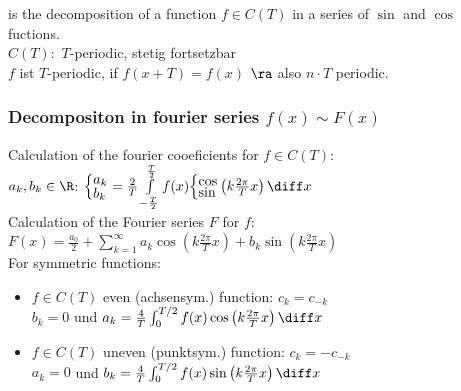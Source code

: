 \documentclass[fs, footer]{latex4ei}
\begin{document}
\begin{multicols*}{4}
{	is the decomposition of a function $f\in C(T)$ in a series of $\sin$ and $\cos$ fuctions.\\
	$C(T):$ $T$-periodic, stetig fortsetzbar\\
	$f$ ist $T$-periodic, if $f(x+T) = f(x)$ $\ra$ also $n \cdot T$ periodic.
	
	\subsubsection{Decompositon in fourier series $f(x) \sim F(x)$}


	 Calculation of the fourier cooeficients for  $f \in C(T)$:\\
	$a_k,b_k \in \R$: \quad $ \Big\{ { ^{\textstyle a_k}_{\textstyle b_k}} = \frac{2}{T} \int\limits_{-\frac{T}{2}}^{\frac{T}{2}} f(x) \Big\{ {}^{\textstyle \cos} _{\textstyle \sin} \left(k \frac{2\pi}{T} x \right) \diff x$\\
	
	
	Calculation of the Fourier series $F$ for $f$:  \\
	$ F(x) = \frac{a_0}{2} + \sum\limits_{k=1}^\infty a_k \cos \left(k \frac{2\pi}{T} x \right) + b_k \sin \left( k \frac{2\pi}{T} x \right) $\\
	

	For symmetric functions:	
	\begin{itemize}
	\item $f \in C(T)$ even (achsensym.) function: $c_k = c_{-k}$ \\
	$b_k = 0$ und $a_k = \frac{4}{T} \int_{0}^{T/2} f(x) \cos \left(k \frac{2\pi}{T} x \right) \diff x$
	\item $f \in C(T)$ uneven (punktsym.) function: $c_k = -c_{-k}$\\
	$a_k = 0$ und $ b_k = \frac{4}{T} \int_{0}^{T/2} f(x) \sin \left(k \frac{2\pi}{T} x \right) \diff x$
	\end{itemize}
}


\sectionbox{	
}
\end{multicols*}
\end{document}

